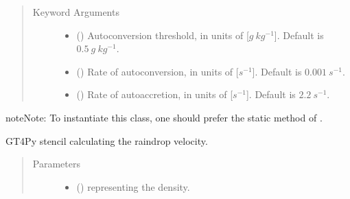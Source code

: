 \documentclass[letterpaper,10pt,english]{sphinxmanual}
\begin{document}
\begin{fulllineitems}
\begin{fulllineitems}
\begin{quote}
\begin{description}
\begin{itemize}
\end{itemize}

\item[{Keyword Arguments}] \leavevmode\begin{itemize}
\item {} 
 () \textendash{} Autoconversion threshold, in units of {[}\(g ~ kg^{-1}\){]}. Default is \(0.5 ~ g ~ kg^{-1}\).

\item {} 
 () \textendash{} Rate of autoconversion, in units of {[}\(s^{-1}\){]}. Default is \(0.001 ~ s^{-1}\).

\item {} 
 () \textendash{} Rate of autoaccretion, in units of {[}\(s^{-1}\){]}. Default is \(2.2 ~ s^{-1}\).

\end{itemize}

\end{description}\end{quote}

\begin{sphinxadmonition}{note}{Note:}
To instantiate this class, one should prefer the static method
{\hyperref[\detokenize{api:tasmania.parameterizations.slow_tendencies.SlowTendencyMicrophysics.factory}]{}} of
{\hyperref[\detokenize{api:tasmania.parameterizations.slow_tendencies.SlowTendencyMicrophysics}]{}}.
\end{sphinxadmonition}

\end{fulllineitems}


\begin{fulllineitems}
\label{\detokenize{api:tasmania.parameterizations.slow_tendency_microphysics_kessler_wrf_saturation.SlowTendencyMicrophysicsKesslerWRFSaturation._stencil_raindrop_fall_velocity_defs}}
GT4Py stencil calculating the raindrop velocity.
\begin{quote}\begin{description}
\item[{Parameters}] \leavevmode\begin{itemize}
\item {} 
 () \textendash{}  representing the density.


\end{itemize}
\end{description}
\end{quote}
\end{fulllineitems}
\end{fulllineitems}
\end{document}
